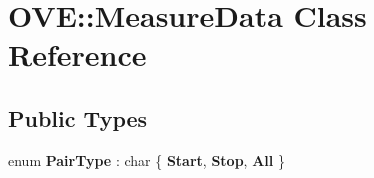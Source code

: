 \hypertarget{class_o_v_e_1_1_measure_data}{}\section{O\+VE\+:\+:Measure\+Data Class Reference}
\label{class_o_v_e_1_1_measure_data}
\subsection*{Public Types}
\begin{DoxyCompactItemize}
\item 
\mbox{\label{class_o_v_e_1_1_measure_data_a6965835bc213a8ea3c2a4db2ed7e4280}} 
enum {\bfseries Pair\+Type} \+: char \{ {\bfseries Start}, 
{\bfseries Stop}, 
{\bfseries All}
 \}
\end{DoxyCompactItemize}
